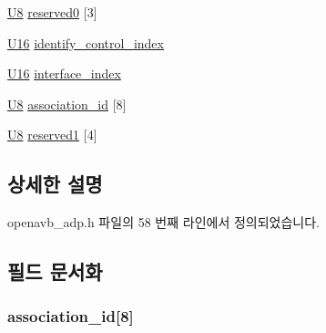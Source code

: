 \begin{DoxyCompactItemize}
\item 
\hyperlink{openavb__types__base__pub_8h_aa63ef7b996d5487ce35a5a66601f3e73}{U8} \hyperlink{structopenavb__adp__data__unit__t_a0c2fb64a266474c53c5b370e9f9bba70}{reserved0} \mbox{[}3\mbox{]}
\item 
\hyperlink{openavb__types__base__pub_8h_a0a0a322d5fa4a546d293a77ba8b4a71f}{U16} \hyperlink{structopenavb__adp__data__unit__t_a3eb7ec791879c83d6a38c2aaa156c964}{identify\+\_\+control\+\_\+index}
\item 
\hyperlink{openavb__types__base__pub_8h_a0a0a322d5fa4a546d293a77ba8b4a71f}{U16} \hyperlink{structopenavb__adp__data__unit__t_a527cbe894109bf3cc338d42cae235c77}{interface\+\_\+index}
\item 
\hyperlink{openavb__types__base__pub_8h_aa63ef7b996d5487ce35a5a66601f3e73}{U8} \hyperlink{structopenavb__adp__data__unit__t_a920b3895c87e46889863d44538f57702}{association\+\_\+id} \mbox{[}8\mbox{]}
\item 
\hyperlink{openavb__types__base__pub_8h_aa63ef7b996d5487ce35a5a66601f3e73}{U8} \hyperlink{structopenavb__adp__data__unit__t_a717895c028e3570d18efb49f76dd1fc6}{reserved1} \mbox{[}4\mbox{]}
\end{DoxyCompactItemize}


\subsection{상세한 설명}


openavb\+\_\+adp.\+h 파일의 58 번째 라인에서 정의되었습니다.



\subsection{필드 문서화}
\subsubsection[{\texorpdfstring{association\+\_\+id}{association_id}}]{ association\+\_\+id\mbox{[}8\mbox{]}}\hypertarget{structopenavb__adp__data__unit__t_a920b3895c87e46889863d44538f57702}{}\label{structopenavb__adp__data__unit__t_a920b3895c87e46889863d44538f57702}


